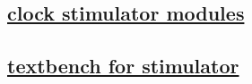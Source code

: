 \documentclass{article}
\begin{document}
  


  \subsection{\href{../files/tm_stim_clk-v.html}{clock stimulator modules}}
  \subsection{\href{../files2/tb_clk-v.html}{textbench for stimulator}}
\end{document}
